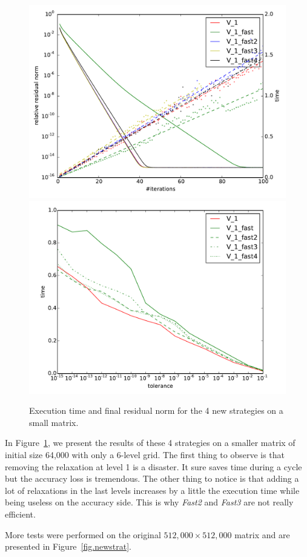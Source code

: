 \documentclass[10pt,conference]{IEEEtran}
\begin{document}
  \begin{figure}
  \includegraphics[width=0.49\linewidth]{figs/convergence_fast_small.pdf}
   \includegraphics[width=0.49\linewidth]{figs/time_convergence_fast_small.pdf}
   \caption{Execution time and final residual norm for the 4 new strategies on a small matrix.}
   \label{fig.newstrat_small}
  \end{figure}

  In Figure~\ref{fig.newstrat_small}, we present the results of these 4 strategies on a smaller matrix of initial size 64,000 with only a 6-level grid.
  The first thing to observe is that removing the relaxation at level 1 is a disaster. It sure saves time during a cycle but the accuracy loss is tremendous.
  The other thing to notice is that adding a lot of relaxations in the last levels increases by a little the execution time while being useless on the accuracy side. This is why \emph{Fast2} and  \emph{Fast3} are not really efficient.
  
  More tests were performed on the original $512,000\times 512,000$ matrix and are presented in Figure~\ref{fig.newstrat}.
  
\end{document}
